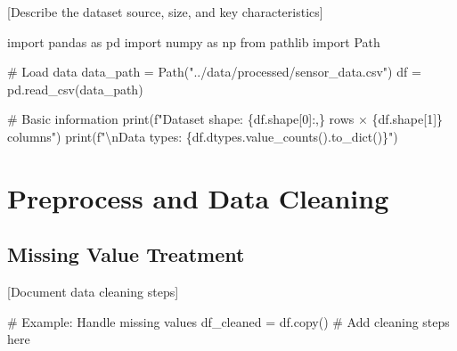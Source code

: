\documentclass[
  letterpaper,
  DIV=11,
  numbers=noendperiod]{scrartcl}
\newenvironment{Shaded}{\begin{snugshade}}{\end{snugshade}}
\newcommand{\BuiltInTok}[1]{\textcolor[rgb]{0.00,0.23,0.31}{#1}}
\newcommand{\CharTok}[1]{\textcolor[rgb]{0.13,0.47,0.30}{#1}}
\newcommand{\CommentTok}[1]{\textcolor[rgb]{0.37,0.37,0.37}{#1}}
\newcommand{\DecValTok}[1]{\textcolor[rgb]{0.68,0.00,0.00}{#1}}
\newcommand{\ImportTok}[1]{\textcolor[rgb]{0.00,0.46,0.62}{#1}}
\newcommand{\NormalTok}[1]{\textcolor[rgb]{0.00,0.23,0.31}{#1}}
\newcommand{\OperatorTok}[1]{\textcolor[rgb]{0.37,0.37,0.37}{#1}}
\newcommand{\SpecialCharTok}[1]{\textcolor[rgb]{0.37,0.37,0.37}{#1}}
\newcommand{\SpecialStringTok}[1]{\textcolor[rgb]{0.13,0.47,0.30}{#1}}
\newcommand{\StringTok}[1]{\textcolor[rgb]{0.13,0.47,0.30}{#1}}
\renewenvironment{Shaded}{%
  \begin{tcolorbox}[%
    enhanced,%
    colback=codebg,%
    colframe=codebg,%
    borderline west={3pt}{0pt}{sectionblue},%
    fontupper=\small\ttfamily,%
    boxrule=0pt,%
    arc=0pt,%
    boxsep=5pt,%
    left=2mm,%
    right=2mm,%
    top=2mm,%
    bottom=2mm%
  ]%
}{%
  \end{tcolorbox}%
}
\begin{document}
{[}Describe the dataset source, size, and key characteristics{]}

\begin{Shaded}
\begin{Highlighting}[]
\ImportTok{import}\NormalTok{ pandas }\ImportTok{as}\NormalTok{ pd}
\ImportTok{import}\NormalTok{ numpy }\ImportTok{as}\NormalTok{ np}
\ImportTok{from}\NormalTok{ pathlib }\ImportTok{import}\NormalTok{ Path}

\CommentTok{\# Load data}
\NormalTok{data\_path }\OperatorTok{=}\NormalTok{ Path(}\StringTok{"../data/processed/sensor\_data.csv"}\NormalTok{)}
\NormalTok{df }\OperatorTok{=}\NormalTok{ pd.read\_csv(data\_path)}

\CommentTok{\# Basic information}
\BuiltInTok{print}\NormalTok{(}\SpecialStringTok{f"Dataset shape: }\SpecialCharTok{\{}\NormalTok{df}\SpecialCharTok{.}\NormalTok{shape[}\DecValTok{0}\NormalTok{]}\SpecialCharTok{:,\}}\SpecialStringTok{ rows × }\SpecialCharTok{\{}\NormalTok{df}\SpecialCharTok{.}\NormalTok{shape[}\DecValTok{1}\NormalTok{]}\SpecialCharTok{\}}\SpecialStringTok{ columns"}\NormalTok{)}
\BuiltInTok{print}\NormalTok{(}\SpecialStringTok{f"}\CharTok{\textbackslash{}n}\SpecialStringTok{Data types: }\SpecialCharTok{\{}\NormalTok{df}\SpecialCharTok{.}\NormalTok{dtypes}\SpecialCharTok{.}\NormalTok{value\_counts()}\SpecialCharTok{.}\NormalTok{to\_dict()}\SpecialCharTok{\}}\SpecialStringTok{"}\NormalTok{)}
\end{Highlighting}
\end{Shaded}

\section{Preprocess and Data
Cleaning}\label{preprocess-and-data-cleaning}

\subsection{Missing Value Treatment}\label{missing-value-treatment}

{[}Document data cleaning steps{]}

\begin{Shaded}
\begin{Highlighting}[]
\CommentTok{\# Example: Handle missing values}
\NormalTok{df\_cleaned }\OperatorTok{=}\NormalTok{ df.copy()}
\CommentTok{\# Add cleaning steps here}
\end{Highlighting}
\end{Shaded}
\end{document}
